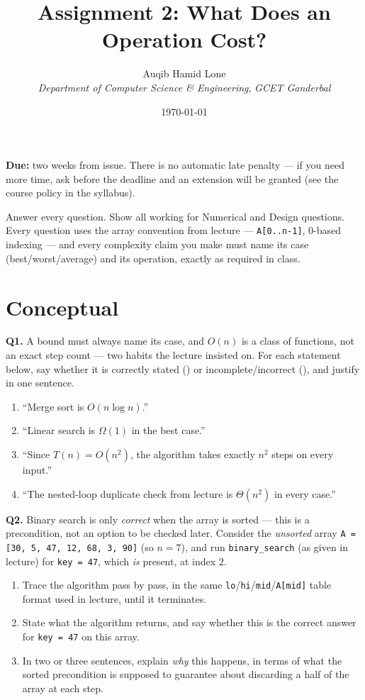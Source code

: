 \documentclass[11pt]{article}
\title{Assignment 2: What Does an Operation Cost?}
\author{Auqib Hamid Lone\\[0.3em]
  \emph{Department of Computer Science \& Engineering}, \emph{GCET Ganderbal}}
\date{\today}
\begin{document}
\maketitle

\noindent\textbf{Due:} two weeks from issue. There is no automatic late penalty --- if you need more time, ask before the deadline and an extension will be granted (see the course policy in the syllabus).

\noindent Answer every question. Show all working for Numerical and Design questions. Every question uses the array convention from lecture --- \texttt{A[0..n-1]}, 0-based indexing --- and every complexity claim you make must name its case (best/worst/average) and its operation, exactly as required in class.

\section{Conceptual}

\textbf{Q1.} A bound must always name its case, and $O(n)$ is a class of functions, not an exact step count --- two habits the lecture insisted on. For each statement below, say whether it is correctly stated () or incomplete/incorrect (), and justify in one sentence.
\begin{enumerate}
  \item[(a)] ``Merge sort is $O(n \log n)$.''
  \item[(b)] ``Linear search is $\Omega(1)$ in the best case.''
  \item[(c)] ``Since $T(n) = O(n^2)$, the algorithm takes exactly $n^2$ steps on every input.''
  \item[(d)] ``The nested-loop duplicate check from lecture is $\Theta(n^2)$ in every case.''
\end{enumerate}

\textbf{Q2.} Binary search is only \emph{correct} when the array is sorted --- this is a precondition, not an option to be checked later. Consider the \emph{unsorted} array \texttt{A = [30, 5, 47, 12, 68, 3, 90]} (so $n = 7$), and run \texttt{binary\_search} (as given in lecture) for \texttt{key = 47}, which \emph{is} present, at index $2$.
\begin{enumerate}
  \item[(a)] Trace the algorithm pass by pass, in the same \texttt{lo}/\texttt{hi}/\texttt{mid}/\texttt{A[mid]} table format used in lecture, until it terminates.
  \item[(b)] State what the algorithm returns, and say whether this is the correct answer for \texttt{key = 47} on this array.
  \item[(c)] In two or three sentences, explain \emph{why} this happens, in terms of what the sorted precondition is supposed to guarantee about discarding a half of the array at each step.
\end{enumerate}
\end{document}
